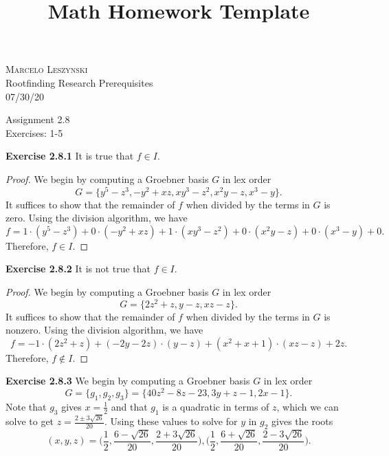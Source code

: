 \documentclass[12pt,oneside]{article}
\newenvironment{exercise}[1]{\vspace{.1in}\noindent\textbf{Exercise #1 \hspace{.05em}}}{}
\begin{document}
\title{Math Homework Template}

\begin{flushright}
\textsc{Marcelo Leszynski}  \\
Rootfinding Research Prerequisites\\
07/30/20
\end{flushright}

\begin{center}
\textsf{Assignment 2.8 } \\
\textsf{Exercises: 1-5 }
\end{center}


\begin{exercise}{2.8.1}
    It is true that $f \in I$.
    \begin{proof}
        We begin by computing a Groebner basis $G$ in lex order 
        \[
            G = \{y^5-z^3,-y^2+xz,xy^3-z^2,x^2y-z,x^3-y\}.
        \]
        It suffices to show that the remainder of $f$ when divided by the 
        terms in $G$ is zero. Using the division algorithm, we have 
        \[
            f=1\cdot(y^5-z^3)+0\cdot(-y^2+xz)+1\cdot(xy^3-z^2)+0\cdot(x^2y-z)+0\cdot(x^3-y)+0.
        \]
        Therefore, $f \in I$.
    \end{proof}
\end{exercise}


\begin{exercise}{2.8.2}
    It is not true that $f \in I$.
    \begin{proof}
        We begin by computing a Groebner basis $G$ in lex order
        \[
            G = \{2z^2+z,y-z,xz-z\}.
        \]
        It suffices to show that the remainder of $f$ when divided by the 
        terms in $G$ is nonzero. Using the division algorithm, we have 
        \[
            f=-1\cdot(2z^2+z)+(-2y-2z)\cdot(y-z)+(x^2+x+1)\cdot(xz-z)+2z.
        \]
        Therefore, $f \not \in I$.
    \end{proof}
\end{exercise}


\begin{exercise}{2.8.3}
    We begin by computing a Groebner basis $G$ in lex order
    \[
        G = \{g_1,g_2,g_3\} = \{40z^2-8z-23,3y+z-1,2x-1\}.
    \]
    Note that $g_3$ gives $x=\frac{1}{2}$ and that $g_1$ is a quadratic in terms of $z$,
    which we can solve to get $z=\frac{2\pm 3\sqrt{26}}{20}$. Using these values to solve 
    for $y$ in $g_2$ gives the roots
    \[
        (x,y,z) = \biggr(\frac{1}{2},\frac{6-\sqrt{26}}{20},\frac{2+3\sqrt{26}}{20}\biggr),\biggr(\frac{1}{2},\frac{6+\sqrt{26}}{20},\frac{2-3\sqrt{26}}{20}\biggr).
    \]
\end{exercise}
\end{document}

